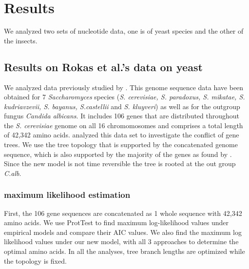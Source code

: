 \section{Results}

We analyzed two sets of nucleotide data, one is of yeast species and the other of the insects. 

\subsection{Results on Rokas et al.'s data on yeast}
We analyzed data previously studied by \citet{rokas2003nature}.
This genome sequence data have been obtained for 7 {\it Saccharomyces} species ({\it S. cerevisiae, S. paradoxus, S. mikatae, S. kudriavzevii, S. bayanus, S.castellii} and {\it S. kluyveri}) as well as for the outgroup fungus {\it Candida albicans}.
It includes 106 genes that are distributed throughout the {\it S. cerevisiae} genome on all 16 chromomosomes and comprises a total length of 42,342 amino acids.
\citet{rokas2003nature} analyzed this data set to investigate the conflict of gene trees.
We use the tree topology that is supported by the concatenated genome sequence, which is also supported by the majority of the genes as found by \citet{rokas2003nature}.
Since the new model is not time reversible the tree is rooted at the out group {\it C.alb}.\\

\subsubsection{maximum likelihood estimation}
First, the 106 gene sequences are concatenated as 1 whole sequence with 42,342 amino acids.
We use ProtTest \citep{prottest, Guindon2003phyml} to find maximum log-likelihood values under empirical models and compare their AIC values.
We also find the maximum log likelihood values under our new model, with all 3 approaches to determine the optimal amino acids.
In all the analyses, tree branch lengths are optimized while the topology is fixed. \\

